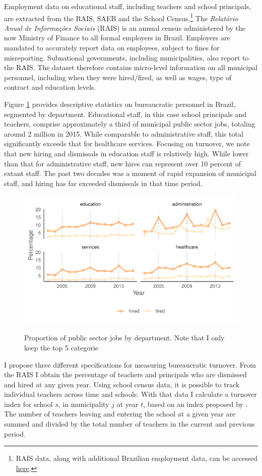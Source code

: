 \documentclass[12pt,a4paper]{article}
\begin{document}
Employment data on educational staff, including teachers and school principals, are extracted from the RAIS, SAEB and the School Census.\footnote{RAIS data, along with additional Brazilian employment data, can be accessed \hyperlink{http://trabalho.gov.br/dados-abertos}{here}.} The \emph{Relatório Anual de Informações Sociais} (RAIS) is an annual census administered by the now Ministry of Finance to all formal employers in Brazil. Employers are mandated to accurately report data on employees, subject to fines for misreporting. Subnational governments, including municipalities, also report to the RAIS. The dataset therefore contains micro-level information on all municipal personnel, including when they were hired/fired, as well as wages, type of contract and education levels.

Figure \ref{fig:staff_turnover} provides descriptive statistics on bureaucratic personnel in Brazil, segmented by department. Educational staff, in this case school principals and teachers, comprise approximately a third of municipal public sector jobs, totaling around 2 million in 2015. While comparable to administrative staff, this total significantly exceeds that for healthcare services. Focusing on turnover, we note that new hiring and dismissals in education staff is relatively high. While lower than that for administrative staff, new hires can represent over 10 percent of extant staff. The past two decades was a moment of rapid expansion of municipal staff, and hiring has far exceeded dismissals in that time period.

\begin{figure}[h]
    \centering
    \includegraphics[width=0.\linewidth]{plots/descriptive_staff_turnover.pdf}
    \label{fig:staff_turnover}
    \caption{Proportion of public sector jobs by department. Note that I only keep the top 5 categorie}
\end{figure}

I propose three different specifications for measuring bureaucratic turnover. From the RAIS I obtain the percentage of teachers and principals who are dismissed and hired at any given year. Using school census data, it is possible to track individual teachers across time and schools. With that data I calculate a turnover index for school $s$, in municipality $j$ at year $t$, based on an index proposed by \citet{pereira_junior_indicadores_2016}. The number of teachers leaving and entering the school at a given year are summed and divided by the total number of teachers in the current and previous period.
\end{document}
